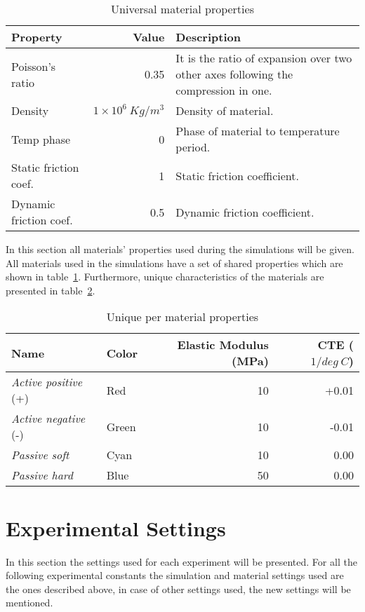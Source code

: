 \begin{table}[ht!]
\centering
\caption{Universal material properties}
\label{UniversalMaterialProperties}
    \begin{tabular}{l r p{7cm}}
    \toprule
    \textbf{Property} & \textbf{Value} & \textbf{Description}\\
    \midrule
    Poisson's ratio & 0.35 &  It is the ratio of expansion over two other axes following the compression in one.\\
    Density & $1\times10^{6}\   Kg/m^3$ & Density of material.\\
    Temp phase & 0 & Phase of material to temperature period.\\
    Static friction coef. & 1 & Static friction coefficient.\\
    Dynamic friction coef. & 0.5 & Dynamic friction coefficient.\\
    \bottomrule
    \end{tabular}
\end{table}

In this section all materials' properties used during the simulations will be given. All materials used in the simulations have a set of shared properties which are shown in table~\ref{UniversalMaterialProperties}. Furthermore, unique characteristics of the materials are presented in table~\ref{UniqueMaterialProperties}.

\begin{table}[ht!]
\centering
\caption{Unique per material properties}
\label{UniqueMaterialProperties}
    \begin{tabular}{llrr}
    \toprule
    \textbf{Name}                & \textbf{Color} & \textbf{Elastic Modulus} (MPa) & \textbf{CTE} ($1/deg\ C$) \\
    \midrule
    \emph{Active positive} (+) & Red   & 10                    & +0.01\\
    \emph{Active negative} (-) & Green & 10                   & -0.01 \\
    \emph{Passive soft}       & Cyan  & 10                   & 0.00 \\
    \emph{Passive hard}        & Blue  & 50                   & 0.00\\
    \bottomrule
    \end{tabular}
\end{table}


\section{Experimental Settings}
In this section the settings used for each experiment will be presented. For all the following experimental constants the simulation and material settings used are the ones described above, in case of other settings used, the new settings will be mentioned.
